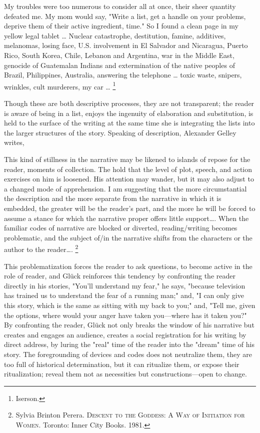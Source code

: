 \documentclass[
]{memoir}
\begin{document}
My troubles were too numerous to consider all at once, their sheer
quantity defeated me. My mom would say, "Write a list, get a handle on
your problems, deprive them of their active ingredient, time." So I
found a clean page in my yellow legal tablet \ldots{} Nuclear
catastrophe, destitution, famine, additives, melanomas, losing face,
U.S. involvement in El Salvador and Nicaragua, Puerto Rico, South Korea,
Chile, Lebanon and Argentina, war in the Middle East, genocide of
Guatemalan Indians and extermination of the native peoples of Brazil,
Philippines, Australia, answering the telephone \ldots{} toxic waste,
snipers, wrinkles, cult murderers, my car \ldots{} \footnote{Iserson.}

Though these are both descriptive processes, they are not transparent;
the reader is aware of being in a list, enjoys the ingenuity of
elaboration and substitution, is held to the surface of the writing at
the same time she is integrating the lists into the larger structures of
the story. Speaking of description, Alexander Gelley writes,

This kind of stillness in the narrative may be likened to islands of
repose for the reader, moments of collection. The hold that the level of
plot, speech, and action exercises on him is loosened. His attention may
wander, but it may also adjust to a changed mode of apprehension. I am
suggesting that the more circumstantial the description and the more
separate from the narrative in which it is embedded, the greater will be
the reader's part, and the more he will be forced to assume a stance for
which the narrative proper offers little support\ldots{}. When the
familiar codes of narrative are blocked or diverted, reading/writing
becomes problematic, and the subject of/in the narrative shifts from the
characters or the author to the reader\ldots{}. \footnote{Sylvia Brinton
  Perera. \textsc{Descent to the Goddess: A Way of Initiation for
  Women}. Toronto: Inner City Books. 1981.}

This problematization forces the reader to ask questions, to become
active in the role of reader, and Glück reinforces this tendency by
confronting the reader directly in his stories, "You'll understand my
fear," he says, "because television has trained us to understand the
fear of a running man;" and, "I can only give this story, which is the
same as sitting with my back to you;" and, "Tell me, given the options,
where would your anger have taken you---where has it taken you?" By
confronting the reader, Glück not only breaks the window of his
narrative but creates and engages an audience, creates a social
registration for his writing by direct address, by luring the "real"
time of the reader into the "dream" time of his story. The foregrounding
of devices and codes does not neutralize them, they are too full of
historical determination, but it can ritualize them, or expose their
ritualization; reveal them not as necessities but constructions---open
to change.
\end{document}

